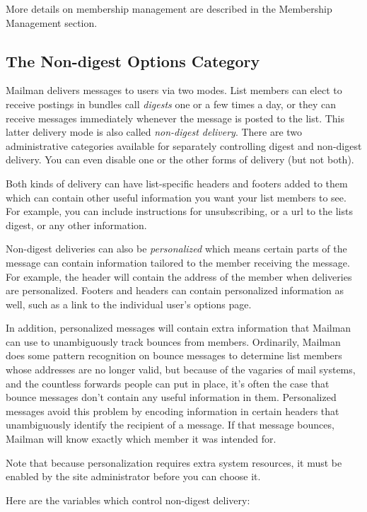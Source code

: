 \documentclass{howto}
\begin{document}
More details on membership management are described in the Membership
Management section.

\subsection{The Non-digest Options Category}

Mailman delivers messages to users via two modes.  List members can
elect to receive postings in bundles call \emph{digests} one or a few
times a day, or they can receive messages immediately whenever the
message is posted to the list.  This latter delivery mode is also
called \emph{non-digest delivery}.  There are two administrative
categories available for separately controlling digest and non-digest
delivery.  You can even disable one or the other forms of delivery
(but not both).

Both kinds of delivery can have list-specific headers and footers
added to them which can contain other useful information you want your
list members to see.  For example, you can include instructions for
unsubscribing, or a url to the lists digest, or any other information.

Non-digest deliveries can also be \emph{personalized} which means
certain parts of the message can contain information tailored to the
member receiving the message.  For example, the  header
will contain the address of the member when deliveries are
personalized.  Footers and headers can contain personalized
information as well, such as a link to the individual user's options
page.

In addition, personalized messages will contain extra information that
Mailman can use to unambiguously track bounces from members.
Ordinarily, Mailman does some pattern recognition on bounce messages
to determine list members whose addresses are no longer valid, but
because of the vagaries of mail systems, and the countless forwards
people can put in place, it's often the case that bounce messages
don't contain any useful information in them.  Personalized messages
avoid this problem by encoding information in certain headers that
unambiguously identify the recipient of a message.  If that message
bounces, Mailman will know exactly which member it was intended for.

Note that because personalization requires extra system resources, it
must be enabled by the site administrator before you can choose it.

Here are the variables which control non-digest delivery:
\end{document}
